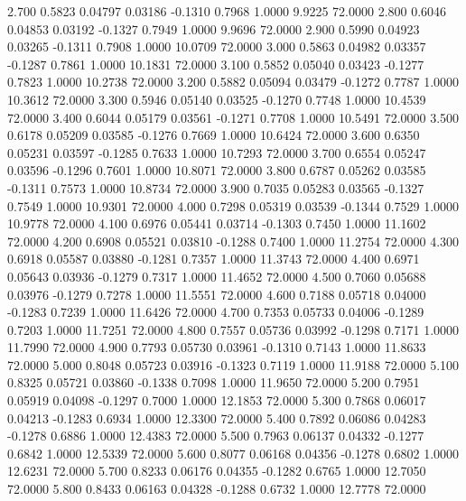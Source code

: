    2.700   0.5823   0.04797   0.03186  -0.1310   0.7968   1.0000   9.9225  72.0000
   2.800   0.6046   0.04853   0.03192  -0.1327   0.7949   1.0000   9.9696  72.0000
   2.900   0.5990   0.04923   0.03265  -0.1311   0.7908   1.0000  10.0709  72.0000
   3.000   0.5863   0.04982   0.03357  -0.1287   0.7861   1.0000  10.1831  72.0000
   3.100   0.5852   0.05040   0.03423  -0.1277   0.7823   1.0000  10.2738  72.0000
   3.200   0.5882   0.05094   0.03479  -0.1272   0.7787   1.0000  10.3612  72.0000
   3.300   0.5946   0.05140   0.03525  -0.1270   0.7748   1.0000  10.4539  72.0000
   3.400   0.6044   0.05179   0.03561  -0.1271   0.7708   1.0000  10.5491  72.0000
   3.500   0.6178   0.05209   0.03585  -0.1276   0.7669   1.0000  10.6424  72.0000
   3.600   0.6350   0.05231   0.03597  -0.1285   0.7633   1.0000  10.7293  72.0000
   3.700   0.6554   0.05247   0.03596  -0.1296   0.7601   1.0000  10.8071  72.0000
   3.800   0.6787   0.05262   0.03585  -0.1311   0.7573   1.0000  10.8734  72.0000
   3.900   0.7035   0.05283   0.03565  -0.1327   0.7549   1.0000  10.9301  72.0000
   4.000   0.7298   0.05319   0.03539  -0.1344   0.7529   1.0000  10.9778  72.0000
   4.100   0.6976   0.05441   0.03714  -0.1303   0.7450   1.0000  11.1602  72.0000
   4.200   0.6908   0.05521   0.03810  -0.1288   0.7400   1.0000  11.2754  72.0000
   4.300   0.6918   0.05587   0.03880  -0.1281   0.7357   1.0000  11.3743  72.0000
   4.400   0.6971   0.05643   0.03936  -0.1279   0.7317   1.0000  11.4652  72.0000
   4.500   0.7060   0.05688   0.03976  -0.1279   0.7278   1.0000  11.5551  72.0000
   4.600   0.7188   0.05718   0.04000  -0.1283   0.7239   1.0000  11.6426  72.0000
   4.700   0.7353   0.05733   0.04006  -0.1289   0.7203   1.0000  11.7251  72.0000
   4.800   0.7557   0.05736   0.03992  -0.1298   0.7171   1.0000  11.7990  72.0000
   4.900   0.7793   0.05730   0.03961  -0.1310   0.7143   1.0000  11.8633  72.0000
   5.000   0.8048   0.05723   0.03916  -0.1323   0.7119   1.0000  11.9188  72.0000
   5.100   0.8325   0.05721   0.03860  -0.1338   0.7098   1.0000  11.9650  72.0000
   5.200   0.7951   0.05919   0.04098  -0.1297   0.7000   1.0000  12.1853  72.0000
   5.300   0.7868   0.06017   0.04213  -0.1283   0.6934   1.0000  12.3300  72.0000
   5.400   0.7892   0.06086   0.04283  -0.1278   0.6886   1.0000  12.4383  72.0000
   5.500   0.7963   0.06137   0.04332  -0.1277   0.6842   1.0000  12.5339  72.0000
   5.600   0.8077   0.06168   0.04356  -0.1278   0.6802   1.0000  12.6231  72.0000
   5.700   0.8233   0.06176   0.04355  -0.1282   0.6765   1.0000  12.7050  72.0000
   5.800   0.8433   0.06163   0.04328  -0.1288   0.6732   1.0000  12.7778  72.0000
